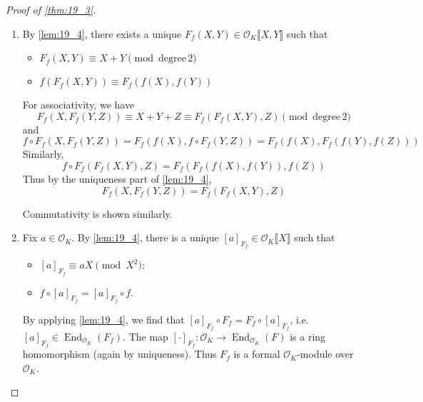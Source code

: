 \documentclass[11pt]{article}
\theoremstyle{definition}
\theoremstyle{plain}
\theoremstyle{remark}
\DeclareMathOperator{\End}{End}
\newcommand{\cO}{\mathcal{O}}
\begin{document}
\begin{proof}[Proof of \autoref{thm:19_3}]\phantom{}
    \begin{enumerate}
        \item By \autoref{lem:19_4}, there exists a unique $F_f(X, Y) \in \cO_K \llbracket X, Y \rrbracket$ such that
            \begin{itemize}
                \item $F_f(X, Y) \equiv X + Y \pmod{\textrm{degree}\,2}$
                \item $f(F_f(X, Y)) \equiv F_f(f(X), f(Y))$
            \end{itemize}
            For associativity, we have
            \begin{equation*}
                F_f(X, F_f(Y, Z)) \equiv X + Y + Z \equiv F_f(F_f(X, Y), Z) \pmod{\textrm{degree}\,2}
            \end{equation*}
            and
            \begin{equation*}
                f \circ F_f(X, F_f(Y, Z)) = F_f(f(X), f \circ F_f(Y, Z)) = F_f(f(X), F_f(f(Y), f(Z)))
            \end{equation*}
            Similarly,
            \begin{equation*}
                f \circ F_f(F_f(X, Y), Z) = F_f(F_f(f(X), f(Y)), f(Z))
            \end{equation*}
            Thus by the uniqueness part of \autoref{lem:19_4},
            \begin{equation*}
                F_f(X, F_f(Y, Z)) = F_f(F_f(X, Y), Z)
            \end{equation*}

            Commutativity is shown similarly.

        \item Fix $a \in \cO_K$. By \autoref{lem:19_4}, there is a unique $[a]_{F_f} \in \cO_K \llbracket X \rrbracket$ such that
            \begin{itemize}
                \item $[a]_{F_f} \equiv a X \pmod{X^2}$;
                \item $f \circ [a]_{F_f} = [a]_{F_f} \circ f$.
            \end{itemize}

            By applying \autoref{lem:19_4}, we find that $[a]_{F_f} \circ F_f = F_f \circ [a]_{F_f}$, i.e. $[a]_{F_f} \in \End_{\cO_K}(F_f)$. The map $[\cdot]_{F_f} : \cO_K \to \End_{\cO_K}(F)$  is a ring homomorphism (again by uniqueness). Thus $F_f$ is a formal $\cO_K$-module over $\cO_K$.


\end{enumerate}
\end{proof}
\end{document}
